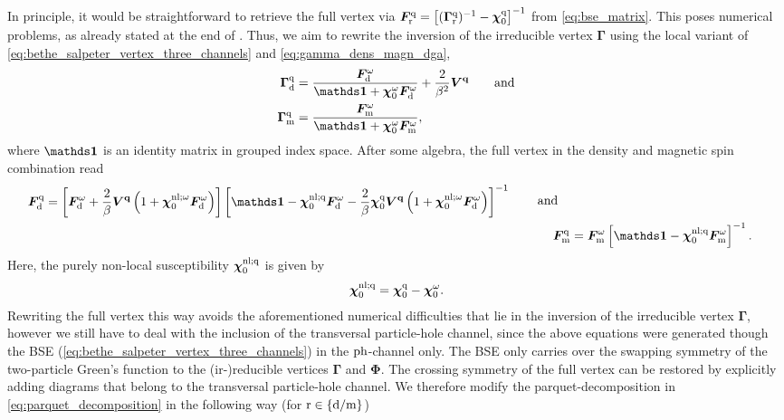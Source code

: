 \documentclass[../../main.tex]{subfiles}
\begin{document}
In principle, it would be straightforward to retrieve the full vertex via $\bm F_{\text{r}}^{\text{q}}=\left [(\bm\Gamma_{\text{r}}^{\text{q}})^{-1}-\bm\chi_{0}^{\text{q}}\right ]^{-1}$ from \eqref{eq:bse_matrix}. This poses numerical problems, as already stated at the end of . Thus, we aim to rewrite the inversion of the irreducible vertex $\bm\Gamma$ using the local variant of \eqref{eq:bethe_salpeter_vertex_three_channels} and \eqref{eq:gamma_dens_magn_dga},
\begin{subequations}
\begin{align}
	\bm\Gamma_{\dens}^{\q}&=\frac{\bm F_{\dens}^{\omega}}{\bm\unity+\bm\chi_{0}^{\omega}\bm F_{\dens}^{\omega}}+\frac{2}{\beta^2}\bm V^{\vv{q}}\qqand\\
	\bm\Gamma_{\magn}^{\q}&=\frac{\bm F_{\magn}^{\omega}}{\bm\unity+\bm\chi_{0}^{\omega}\bm F_{\magn}^{\omega}},
\end{align}
\end{subequations}
where $\bm\unity$ is an identity matrix in grouped index space. After some algebra, the full vertex in the density and magnetic spin combination read
\begin{subequations}
\begin{align}
\begin{split}
	\bm F_{\dens}^{\q}&=\left [\bm F_{\dens}^{\omega}+\frac{2}{\beta}\bm V^{\vv{q}}\left (1+\bm\chi_{0}^{\nl;\omega}\bm F_{\dens}^{\omega}\right )\right ]\left [\bm\unity-\bm\chi_{0}^{\nl;\q}\bm F_{\dens}^{\omega}-\frac{2}{\beta}\bm\chi_{0}^{\q}\bm V^{\vv{q}}\left (1+\bm\chi_{0}^{\nl;\omega}\bm F_{\dens}^{\omega}\right )\right ]^{-1}
\end{split}\;\quad\text{and}\quad\\
	\bm F_{\magn}^{\q}&=\bm F_{\magn}^{\omega}\left [\bm\unity-\bm\chi_{0}^{\nl;\q}\bm F_{\magn}^{\omega}\right ]^{-1}.
\end{align}
\end{subequations}
Here, the purely non-local susceptibility $\bm\chi_{0}^{\text{nl};\text{q}}$ is given by
\begin{align}
	\bm\chi_{0}^{\text{nl};\text{q}}=\bm\chi_{0}^{\text{q}}-\bm\chi_{0}^{\omega}.
\end{align}
Rewriting the full vertex this way avoids the aforementioned numerical difficulties that lie in the inversion of the irreducible vertex $\bm\Gamma$, however we still have to deal with the inclusion of the transversal particle-hole channel, since the above equations were generated though the BSE (\ref{eq:bethe_salpeter_vertex_three_channels}) in the $\text{ph}$-channel only. The BSE only carries over the swapping symmetry of the two-particle Green's function to the (ir-)reducible vertices $\bm\Gamma$ and $\bm\Phi$. The crossing symmetry of the full vertex can be restored by explicitly adding diagrams that belong to the transversal particle-hole channel. We therefore modify the parquet-decomposition in \eqref{eq:parquet_decomposition} in the following way (for $\text{r}\in\{\text{d}/\text{m}\}$)
\end{document}

